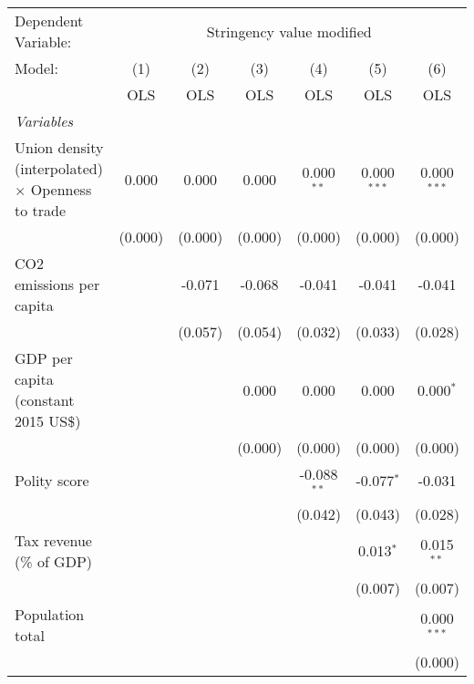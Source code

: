 
\begingroup
\centering
\begin{tabular}{lcccccc}
   \toprule
   Dependent Variable: & \multicolumn{6}{c}{Stringency value modified}\\
   Model:                                                   & (1)     & (2)     & (3)     & (4)           & (5)           & (6)\\  
                                                            &  OLS    & OLS     & OLS     & OLS           & OLS           & OLS\\  
   \midrule
   \emph{Variables}\\
   Union density (interpolated) $\times$ Openness to trade  & 0.000   & 0.000   & 0.000   & 0.000$^{**}$  & 0.000$^{***}$ & 0.000$^{***}$\\   
                                                            & (0.000) & (0.000) & (0.000) & (0.000)       & (0.000)       & (0.000)\\   
   CO2 emissions per capita                                 &         & -0.071  & -0.068  & -0.041        & -0.041        & -0.041\\   
                                                            &         & (0.057) & (0.054) & (0.032)       & (0.033)       & (0.028)\\   
   GDP per capita (constant 2015 US\$)                      &         &         & 0.000   & 0.000         & 0.000         & 0.000$^{*}$\\   
                                                            &         &         & (0.000) & (0.000)       & (0.000)       & (0.000)\\   
   Polity score                                             &         &         &         & -0.088$^{**}$ & -0.077$^{*}$  & -0.031\\   
                                                            &         &         &         & (0.042)       & (0.043)       & (0.028)\\   
   Tax revenue (\% of GDP)                                  &         &         &         &               & 0.013$^{*}$   & 0.015$^{**}$\\   
                                                            &         &         &         &               & (0.007)       & (0.007)\\   
   Population total                                         &         &         &         &               &               & 0.000$^{***}$\\   
                                                            &         &         &         &               &               & (0.000)\\   

\end{tabular}
